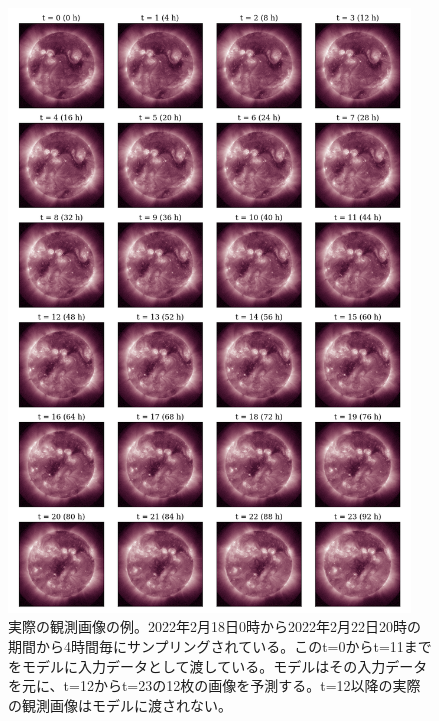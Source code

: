    \begin{figure}[htbp]
      \centering
      \vspace*{-2cm} %
      \includegraphics[width=0.95\textwidth]{figures/exp2/gt.png}
      \caption{実際の観測画像の例。2022年2月18日0時から2022年2月22日20時の期間から4時間毎にサンプリングされている。このt=0からt=11までをモデルに入力データとして渡している。モデルはその入力データを元に、t=12からt=23の12枚の画像を予測する。t=12以降の実際の観測画像はモデルに渡されない。}
      \vspace{-1cm} %
      \label{fig:exp2_gt}
    \end{figure}
